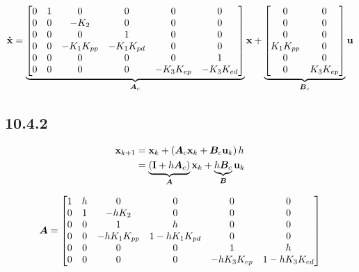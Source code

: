\begin{equation}
	\mathbf{\dot{x}} =
	\underbrace{
		\begin{bmatrix}
			0 & 1 & 0				& 0				& 0				& 0				\\
			0 & 0 & -K_{2}			& 0				& 0				& 0				\\
			0 & 0 & 0				& 1				& 0				& 0				\\
			0 & 0 & -K_{1}K_{pp}	& -K_{1}K_{pd}	& 0				& 0				\\
			0 & 0 & 0				& 0 			& 0				& 1				\\
			0 & 0 & 0				& 0				& -K_{3}K_{ep}	& -K_{3}K_{ed}	\\
		\end{bmatrix}
	}_{\bm{A}_{c}}
	\mathbf{x} +
	\underbrace{
		\begin{bmatrix}
			0			& 0				\\
			0			& 0				\\
			0			& 0				\\
			K_{1}K_{pp}	& 0				\\
			0			& 0				\\
			0			& K_{3}K_{ep}	\\
		\end{bmatrix}
	}_{\bm{B}_{c}}
	\mathbf{u}
\end{equation}



\subsection{10.4.2}

\begin{subequations}
\begin{align}
	\mathbf{x}_{k+1}	&= \mathbf{x}_{k} + \left( \bm{A}_{c} \mathbf{x}_{k} + \bm{B}_{c} \mathbf{u}_{k} \right) h \\
				&= \underbrace{\left( \mathbf{I} + h \bm{A}_{c} \right)}_{\bm{A}} \mathbf{x}_{k}
				+ \underbrace{h \bm{B}_{c}}_{\bm{B}} \mathbf{u}_{k} \\
\end{align}
\end{subequations}

\begin{equation}
	\bm{A} =
	\begin{bmatrix}
		1 & h & 0				& 0					& 0				& 0					\\
		0 & 1 & -hK_{2}			& 0					& 0				& 0					\\
		0 & 0 & 1				& h					& 0				& 0					\\
		0 & 0 & -hK_{1}K_{pp}	& 1-hK_{1}K_{pd}	& 0				& 0					\\
		0 & 0 & 0				& 0					& 1				& h					\\
		0 & 0 & 0				& 0					& -hK_{3}K_{ep}	& 1-hK_{3}K_{ed}	\\
	\end{bmatrix}
\end{equation}

